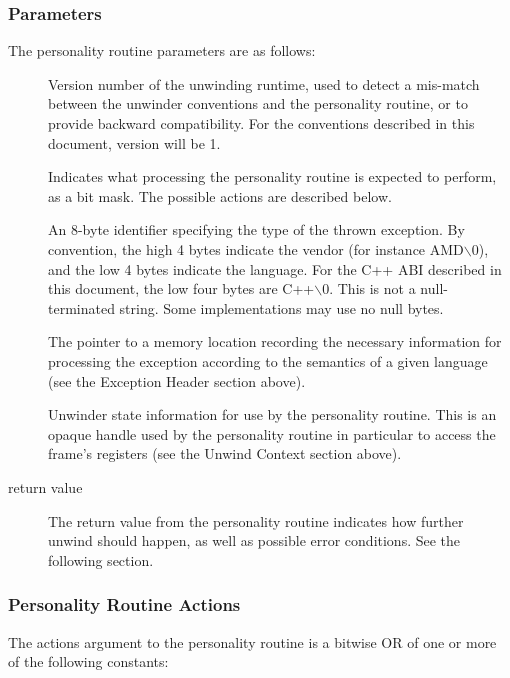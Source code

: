 \subsubsection{Parameters}

The personality routine parameters are as follows:

\begin{description}
\item[] Version number of the unwinding runtime,
   used to detect a mis-match between the unwinder conventions and the
   personality routine, or to provide backward compatibility. For the
   conventions described in this document, version will be 1.
\item[] Indicates what processing the personality routine
   is expected to perform, as a bit mask. The possible actions are
   described below.
\item[] An 8-byte identifier specifying the type of the
   thrown exception. By convention, the high 4 bytes indicate the vendor
   (for instance AMD$\backslash$0), and the low 4 bytes indicate
   the language.  For the C++ ABI described in this document, the low
   four bytes are C++$\backslash$0.  This is not a null-terminated string.
   Some implementations may use no null bytes.
\item[] The pointer to a memory location recording the
   necessary information for processing the exception according to the
   semantics of a given language (see the Exception Header section above).
\item[] Unwinder state information for use by the personality routine.
   This is an opaque handle used by the personality routine in particular
   to access the frame's registers (see the Unwind Context section above).
\item[return value] The return value from the personality routine indicates
   how further unwind should happen, as well as possible error conditions.
   See the following section.
\end{description}

\subsubsection{Personality Routine Actions}

The actions argument to the personality routine is a bitwise OR of one or
more of the following constants: \\

